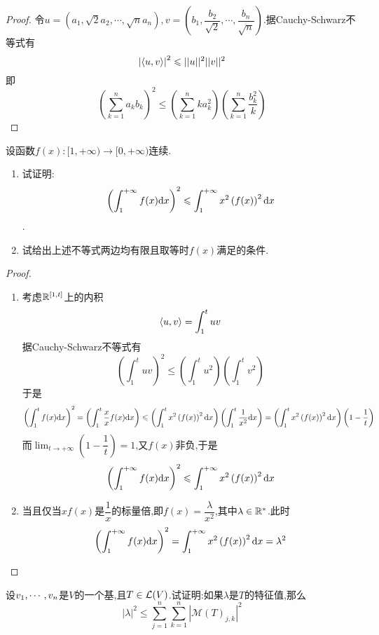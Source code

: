 \documentclass{ctexart}
\begin{document}
\begin{proof}
    令$u=\left(a_1,\sqrt2a_2,\cdots,\sqrt{n}a_n\right),v=\left(b_1,\dfrac{b_2}{\sqrt{2}},\cdots,\dfrac{b_n}{\sqrt{n}}\right)$.据Cauchy-Schwarz不等式有
    \[\left|\left\langle{u},{v}\right\rangle\right|^2\leqslant||u||^2||v||^2\]
    即
    \[\left(\sum_{k=1}^{n}a_kb_k\right)^2\leqslant\left(\sum_{k=1}^{n}ka_k^2\right)\left(\sum_{k=1}^{n}\dfrac{b_k^2}{k}\right)\]
\end{proof}
\begin{problem}[18.]
    设函数$f(x):[1,+\infty)\to[0,+\infty)$连续.
    \begin{enumerate}[label=\tbf{(\arabic*)}]
        \item 试证明:
            \[\left(\int_{1}^{+\infty}f(x)\mathrm{d} x\right)^2\leqslant\int_1^{+\infty}x^2\left(f(x)\right)^2\mathrm{d} x\].
        \item 试给出上述不等式两边均有限且取等时$f(x)$满足的条件.
    \end{enumerate}
\end{problem}
\begin{proof}
    \begin{enumerate}[label=\tbf{(\arabic*)}]
        \item 考虑$\mathbb{R}^{[1,t]}$上的内积
            \[\left\langle{u},{v}\right\rangle=\int_{1}^{t}uv\]
            据Cauchy-Schwarz不等式有
            \[\left(\int_1^tuv\right)^2\leqslant\left(\int_1^t u^2\right)\left(\int_1^t v^2\right)\]
            于是
            \[\left(\int_1^tf(x)\mathrm{d} x\right)^2=\left(\int_1^t\dfrac xxf(x)\mathrm{d} x\right)\leqslant\left(\int_1^tx^2\left(f(x)\right)^2\mathrm{d} x\right)\left(\int_1^t\dfrac{1}{x^2}\mathrm{d} x\right)=\left(\int_1^tx^2\left(f(x)\right)^2\mathrm{d} x\right)\left(1-\dfrac 1t\right)\]
            而$\displaystyle\lim_{t\to+\infty}\left(1-\dfrac1t\right)=1$,又$f(x)$非负,于是
            \[\left(\int_1^{+\infty}f(x)\mathrm{d} x\right)^2\leqslant\int_{1}^{+\infty}x^2\left(f(x)\right)^2\mathrm{d} x\]
        \item 当且仅当$xf(x)$是$\dfrac1x$的标量倍,即$f(x)=\dfrac{\lambda}{x^2}$,其中$\lambda\in\mathbb{R}^*$.此时
            \[\left(\int_1^{+\infty}f(x)\mathrm{d} x\right)^2=\int_{1}^{+\infty}x^2\left(f(x)\right)^2\mathrm{d} x=\lambda^2\]
    \end{enumerate}
\end{proof}
\begin{problem}[19.]
    设${v}_1,\cdots,{v}_{n}$是$V$的一个基,且$T\in\mathcal{L}(V)$.试证明:如果$\lambda$是$T$的特征值,那么
    \[|\lambda|^2\leqslant\sum_{j=1}^n\sum_{k=1}^n\left|\mathcal{M}(T)_{j,k}\right|^2\]
\end{problem}
\end{document}
